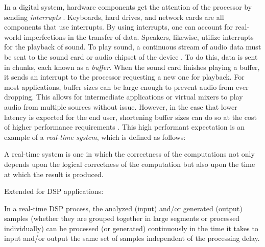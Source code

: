 In a digital system, hardware components get the attention of the processor by sending \textit{interrupts} \cite{Rubini2005-kv}. Keyboards, hard drives, and network cards are all components that use interrupts. By using interrupts, one can account for real-world imperfections in the transfer of data. Speakers, likewise, utilize interrupts for the playback of sound. To play sound, a continuous stream of audio data must be sent to the sound card or audio chipset of the device \cite{Walker_2005}. To do this, data is sent in chunks, each known as a \textit{buffer}. When the sound card finishes playing a buffer, it sends an interrupt to the processor requesting a new one for playback. For most applications, buffer sizes can be large enough to prevent audio from ever dropping. This allows for intermediate applications or virtual mixers to play audio from multiple sources without issue. However, in the case that lower latency is expected for the end user, shortening buffer sizes can do so at the cost of higher performance requirements \cite{corless2009pc-based}. This high performant expectation is an example of a \textit{real-time system}, which is defined as follows:

\begin{defn}\label{def3}
\hfill \break
A real-time system is one in which the correctness of the computations not
only depends upon the logical correctness of the computation but also upon
the time at which the result is produced.

\begin{center}
\hspace*{-10.8cm}\textnormal{Extended for DSP applications:}
\end{center}

\hspace*{-0.6cm}In a real-time DSP process, the analyzed (input) and/or generated (output)
samples (whether they are grouped together in large segments or processed
individually) can be processed (or generated) continuously in the time it
takes to input and/or output the same set of samples independent of the
processing delay.

\end{defn}


